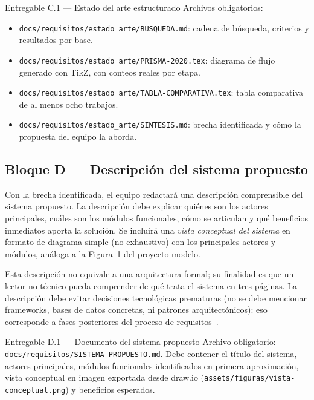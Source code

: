 \documentclass[11pt,a4paper]{article}
\begin{document}
\begin{cajaentregable}{Entregable C.1 --- Estado del arte estructurado}
Archivos obligatorios:
\begin{itemize}
    \item \texttt{docs/requisitos/estado\_arte/BUSQUEDA.md}: cadena de b\'usqueda, criterios y resultados por base.
    \item \texttt{docs/requisitos/estado\_arte/PRISMA-2020.tex}: diagrama de flujo generado con TikZ, con conteos reales por etapa.
    \item \texttt{docs/requisitos/estado\_arte/TABLA-COMPARATIVA.tex}: tabla comparativa de al menos ocho trabajos.
    \item \texttt{docs/requisitos/estado\_arte/SINTESIS.md}: brecha identificada y c\'omo la propuesta del equipo la aborda.
\end{itemize}
\end{cajaentregable}

\subsection{Bloque D --- Descripci\'on del sistema propuesto}

Con la brecha identificada, el equipo redactar\'a una descripci\'on comprensible del sistema propuesto. La descripci\'on debe explicar qui\'enes son los actores principales, cu\'ales son los m\'odulos funcionales, c\'omo se articulan y qu\'e beneficios inmediatos aporta la soluci\'on. Se incluir\'a una \emph{vista conceptual del sistema} en formato de diagrama simple (no exhaustivo) con los principales actores y m\'odulos, an\'aloga a la Figura~1 del proyecto modelo.

Esta descripci\'on no equivale a una arquitectura formal; su finalidad es que un lector no t\'ecnico pueda comprender de qu\'e trata el sistema en tres p\'aginas. La descripci\'on debe evitar decisiones tecnol\'ogicas prematuras (no se debe mencionar frameworks, bases de datos concretas, ni patrones arquitect\'onicos): eso corresponde a fases posteriores del proceso de requisitos~\cite{sommerville2011software,wiegers2013software}.

\begin{cajaentregable}{Entregable D.1 --- Documento del sistema propuesto}
Archivo obligatorio: \texttt{docs/requisitos/SISTEMA-PROPUESTO.md}. Debe contener el t\'itulo del sistema, actores principales, m\'odulos funcionales identificados en primera aproximaci\'on, vista conceptual en imagen exportada desde draw.io (\texttt{assets/figuras/vista-conceptual.png}) y beneficios esperados.
\end{cajaentregable}
\end{document}
